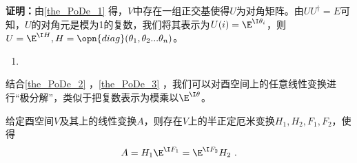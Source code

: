 \textbf{证明：}由\autoref{the_PoDe_1} 得，$V$中存在一组正交基使得$U$为对角矩阵。由$UU^{\dagger}=E$可知，$U$的对角元是模为1的复数，我们将其表示为$U(i)=\E^{\I\theta_i}$，则$U=\E^{\I H},H=\opn{diag}(\theta_1,\theta_2...\theta_n)$。
\begin{example}{}
\begin{enumerate}
\item 
\end{enumerate}
\end{example}
结合\autoref{the_PoDe_2} ，\autoref{the_PoDe_3} ，我们可以对酉空间上的任意线性变换进行“极分解”，类似于把复数表示为模乘以$\E^{\I\theta}$。
\begin{corollary}{}
给定酉空间$V$及其上的线性变换$A$，则存在$V$上的半正定厄米变换$H_1,H_2,F_1,F_2$，使得
\begin{equation}
A=H_1\E^{\I F_1}=\E^{\I F_2}H_2~.
\end{equation}
\end{corollary}
